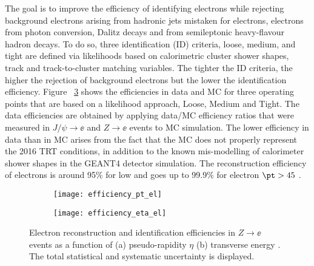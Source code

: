 The goal is to improve the efficiency of identifying electrons while rejecting background electrons arising from hadronic jets mistaken for electrons, 
electrons from photon conversion, Dalitz decays and from semileptonic heavy-flavour hadron decays.
To do so, three identification (ID) criteria, loose, medium, and tight are defined via likelihoods based on calorimetric cluster shower shapes, 
track and track-to-cluster matching variables.
The tighter the ID criteria, the higher the rejection of background electrons but the lower the identification efficiency.
Figure ~\ref{fig:exp.reco.eff.el} shows the  efficiencies in data and MC for three operating points that are based on a likelihood approach, Loose, Medium and Tight. 
The data efficiencies are obtained by applying data/MC efficiency ratios that were measured in  $J/\psi\to\ee$ and $Z\to\ee$ events to MC simulation. 
The lower efficiency in data than in MC arises from the fact that the MC does not properly represent the 2016 TRT conditions, 
in addition to the known mis-modelling of calorimeter shower shapes in the GEANT4 detector simulation.
The reconstruction efficiency of electrons is around 95\% for low \pt and goes up to 99.9\% for electron $\pt > 45$ \GeV.


\begin{figure}[htb!]
\centering
\begin{subfigure}[t]{0.45\textwidth}
\texttt{[image: efficiency\_pt\_el]}
\subcaption{}
\label{fig:exp.reco.eff_pt}
\end{subfigure}
\begin{subfigure}[t]{0.45\textwidth}
\texttt{[image: efficiency\_eta\_el]}
\subcaption{}
\label{fig:exp.reco.eff_eta}
\end{subfigure}
\vspace{-0.25cm}
\caption{
Electron reconstruction and identification efficiencies in $Z\to\ee$ events as a function of (a) pseudo-rapidity $\eta$ (b) transverse energy \et.
The total statistical and systematic uncertainty is displayed. 
}
\label{fig:exp.reco.eff.el}
\end{figure} 



